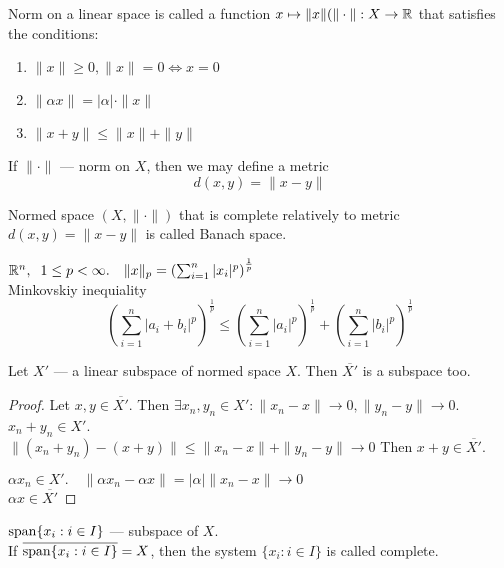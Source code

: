 \begin{definition}
  Norm on a linear space is called a function $x \mapsto \|x\| (\|\cdot\|: X \to  \mathbb{R}$ that satisfies the conditions:
  \begin{enumerate}
    \item  $\|x\|\ge 0, \|x\|= 0 \iff x = 0$ 
    \item $\|\alpha x\| = | \alpha | \cdot \|x\|$ 
    \item $\|x+y\| \le  \|x\| + \|y\|$
  \end{enumerate}
\end{definition}

If  $\|\cdot\|$ --- norm on $X$, then we may define a metric
\[ d(x,y) = \|x-y\| \] 

\begin{definition}
  Normed space $(X, \|\cdot\|)$ that is complete relatively to metric $d(x,y) = \|x-y\|$ is called Banach space.
\end{definition}

\begin{example}
  $\mathbb{R}^{n}, \;\; 1 \le  p < \infty. \quad \|x\|_p = \left( \sum_{i=1}^{n} |x_i|^{p} \right)^{\frac{1}{p}} $ \\
  Minkovskiy inequiality
  \[ \left( \sum_{i=1}^{n} |a_i + b_i|^{p} \right)^{\frac{1}{p}} \le \left( \sum_{i=1}^{n} |a_i|^{p} \right) ^{\frac{1}{p}} + \left( \sum_{i=1}^{n} |b_i|^{p} \right) ^{\frac{1}{p}}\] 

\end{example}

\begin{proposition}
  Let $X'$ --- a linear subspace of normed space $X$. Then $\overline{X'}$ is a subspace too.
\end{proposition}

\begin{proof}
  Let $x, y \in  \overline{X'}$. Then $\exists x_n, y_n \in  X': \|x_n - x\| \to 0, \|y_n - y\| \to  0$.\\
  $x_n + y_n \in X'$.\\
  $\|(x_n+y_n) - (x+y)\| \le  \|x_n-x\| + \|y_n-y\| \to 0$
  Then $x + y \in  \overline{X'}.$

  $\alpha x_n \in  X'. \quad \|\alpha x_n - \alpha x\| = |\alpha| \| x_n - x\| \to  0$\\
  $\alpha x \in  \overline{X'}$
\end{proof}



\begin{definition}
  $\operatorname{span} \{x_i: i \in  I\} $ --- subspace of $X$.\\
  If $\overline{\operatorname{span} \{x_i : i \in I\}} = X $, then the system $\{x_i: i \in I\} $ is called complete.
\end{definition}

